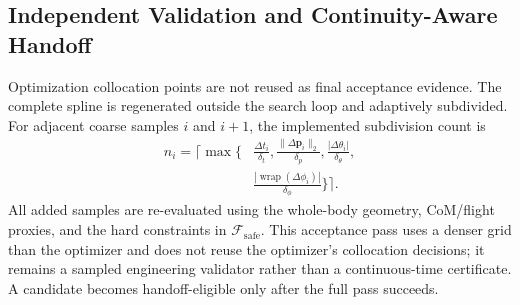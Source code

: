 \documentclass[journal,twoside]{IEEEtran}
\newcommand{\wrap}{\operatorname{wrap}}
\begin{document}
\subsection{Independent Validation and Continuity-Aware Handoff}
Optimization collocation points are not reused as final acceptance evidence. The complete spline is regenerated outside the search loop and adaptively subdivided. For adjacent coarse samples $i$ and $i+1$, the implemented subdivision count is
\begin{equation}
\begin{aligned}
n_i=\Bigg\lceil\max\Bigg\{&
 \frac{\Delta t_i}{\delta_t},
 \frac{\|\Delta\mathbf p_i\|_2}{\delta_p},
 \frac{|\Delta\theta_i|}{\delta_\theta},\\[-1mm]
&
 \frac{|\wrap(\Delta\phi_i)|}{\delta_\phi}
\Bigg\}\Bigg\rceil.
\end{aligned}
\label{eq:dense_validation}
\end{equation}
All added samples are re-evaluated using the whole-body geometry, CoM/flight proxies, and the hard constraints in $\mathcal F_{\mathrm{safe}}$. This acceptance pass uses a denser grid than the optimizer and does not reuse the optimizer's collocation decisions; it remains a sampled engineering validator rather than a continuous-time certificate. A candidate becomes handoff-eligible only after the full pass succeeds.
\end{document}
